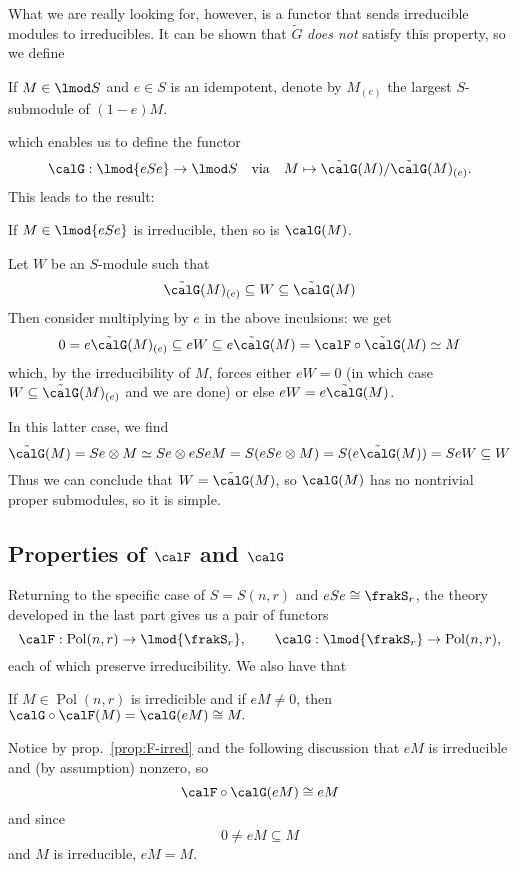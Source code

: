 \documentclass[12pt]{article}
\DeclareMathOperator{\Pol}{Pol}
\begin{document}
What we are really looking for, however, is a functor that sends irreducible modules to irreducibles. It can be shown that $\tilde G$ 
\textit{does not} satisfy this property, so we define 
\begin{defn}
	If $M\in\lmod S$ and $e\in S$ is an idempotent, denote by $M_{(e)}$ the largest $S$-submodule of $(1-e)M$.
\end{defn}
\noindent which enables us to define the functor 
\[\calG:\lmod{eSe}\to \lmod S\quad\text{via}\quad M\mapsto \tilde\calG(M)/\tilde\calG(M)_{(e)}.\]
This leads to the result:
\begin{prop}
	If $M\in \lmod{eSe}$ is irreducible, then so is $\calG(M)$.
\end{prop}
\begin{prf}
	Let $W$ be an $S$-module such that 
	\[\tilde\calG(M)_{(e)}\subseteq W\subseteq \tilde\calG(M)\]
	Then consider multiplying by $e$ in the above inculsions:
	we get
	\[0=e\tilde\calG(M)_{(e)}\subseteq eW\subseteq e\tilde \calG(M)=\calF\circ\tilde\calG(M)\simeq M\]
	which, by the irreducibility of $M$, forces either $eW=0$ (in which case $W\subseteq\tilde\calG(M)_{(e)}$ and we are done)
	or else $eW=e\tilde\calG(M)$.

	In this latter case, we find 
	\[\tilde\calG(M)= Se\otimes M\simeq Se\otimes eSeM=S(eSe\otimes M)=S(e\tilde\calG(M))=SeW\subseteq W\]
	Thus we can conclude that $W=\tilde\calG(M)$, so $\calG(M)$ has no nontrivial proper submodules, so it is simple.
\end{prf}

\subsection{Properties of \texorpdfstring{$\calF$ and $\calG$}{F and G}}
Returning to the specific case of $S=S(n,r)$ and $eSe\cong\frakS_r$, the theory developed in the last part
gives us a pair of functors
\[\calF:\Pol(n,r)\to \lmod{\frakS_r},\qquad \calG:\lmod{\frakS_r}\to \Pol(n,r),\]
each of which preserve irreducibility. We also have that
\begin{prop}
	If $M\in \Pol(n,r)$ is irredicible and if $eM\ne 0$, then $\calG\circ\calF(M)=\calG(eM)\cong M.$
\end{prop}
\begin{prf}
	Notice by prop.~\ref{prop:F-irred} and the following discussion that $eM$ is irreducible and (by assumption) nonzero, so
	\[\calF\circ\calG(eM)\cong eM\]
	and since 
	\[0\ne eM\subseteq M\]
	and $M$ is irreducible, $eM=M$.
\end{prf}
\end{document}
